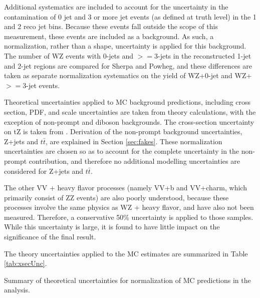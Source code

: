 Additional systematics are included to account for the uncertainty in the contamination of 0 jet and 3 or more jet events (as defined at truth level) in the 1 and 2 reco jet bins. Because these events fall outside the scope of this measurement, these events are included as a background. As such, a normalization, rather than a shape, uncertainty is applied for this background. The number of WZ events with 0-jets and $>=$3-jets in the reconstructed 1-jet and 2-jet regions are compared for Sherpa and Powheg, and these differences are taken as separate normalization systematics on the yield of WZ+0-jet and WZ+$>=$3-jet events.

Theoretical uncertainties applied to MC background predictions, including cross section, PDF, and scale uncertainties are taken from theory calculations, with the exception of non-prompt and diboson backgrounds. The cross-section uncertainty on tZ is taken from \cite{tZ_paper}. Derivation of the non-prompt background uncertainties, Z+jets and $t\bar{t}$, are explained in Section \ref{sec:fakes}. These normalization uncertainties are chosen so as to account for the complete uncertainty in the non-prompt contribution, and therefore no additional modelling uncertainties are considered for Z+jets and $t\bar{t}$.

The other VV + heavy flavor processes (namely VV+b and VV+charm, which primarily consist of ZZ events) are also poorly understood, because these processes involve the same physics as WZ + heavy flavor, and have also not been measured. Therefore, a conservative 50\% uncertainty is applied to those samples. While this uncertainty is large, it is found to have little impact on the significance of the final result.

The theory uncertainties applied to the MC estimates are summarized in Table \ref{tab:xsecUnc}. 

\begin{table}[H]
{\footnotesize
\centering

\caption{Summary of theoretical uncertainties for normalization of MC predictions in the analysis.}
\label{tab:xsecUnc}
}
\end{table}

